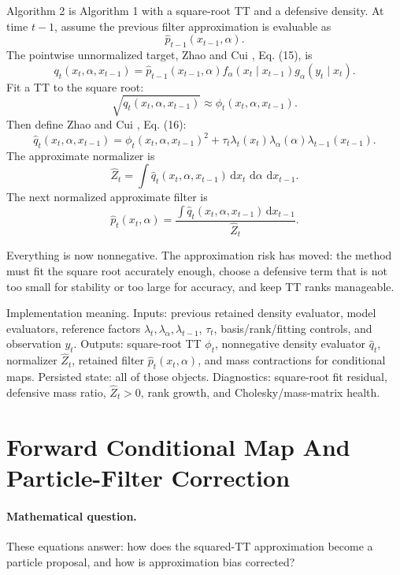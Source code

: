 \documentclass[11pt]{article}
\newcommand{\dd}{\,\mathrm d}
\begin{document}
Algorithm 2 is Algorithm 1 with a square-root TT and a defensive density.
At time \(t-1\), assume the previous filter approximation is evaluable as
\[
    \widehat p_{t-1}(x_{t-1},\alpha).
\]
The pointwise unnormalized target, Zhao and Cui \cite{zhao2024ttsequential}, Eq. (15), is
\[
    q_t(x_t,\alpha,x_{t-1})
    =
    \widehat p_{t-1}(x_{t-1},\alpha)
    f_\alpha(x_t\mid x_{t-1})
    g_\alpha(y_t\mid x_t).
    \label{eq:p24-a2-1}
\]
Fit a TT to the square root:
\[
    \sqrt{q_t(x_t,\alpha,x_{t-1})}
    \approx
    \phi_t(x_t,\alpha,x_{t-1}).
    \label{eq:p24-a2-2}
\]
Then define Zhao and Cui \cite{zhao2024ttsequential}, Eq. (16):
\[
    \widehat q_t(x_t,\alpha,x_{t-1})
    =
    \phi_t(x_t,\alpha,x_{t-1})^2
    +
    \tau_t\lambda_t(x_t)\lambda_\alpha(\alpha)\lambda_{t-1}(x_{t-1}).
    \label{eq:p24-a2-3}
\]
The approximate normalizer is
\[
    \widehat Z_t
    =
    \int \widehat q_t(x_t,\alpha,x_{t-1})
    \dd x_t\,\dd\alpha\,\dd x_{t-1}.
    \label{eq:p24-a2-4}
\]
The next normalized approximate filter is
\[
    \widehat p_t(x_t,\alpha)
    =
    \frac{\int \widehat q_t(x_t,\alpha,x_{t-1})\dd x_{t-1}}
    {\widehat Z_t}.
    \label{eq:p24-a2-5}
\]

Everything is now nonnegative.  The approximation risk has moved: the method
must fit the square root accurately enough, choose a defensive term that is not
too small for stability or too large for accuracy, and keep TT ranks manageable.

Implementation meaning. Inputs: previous retained density evaluator,
model evaluators, reference factors \(\lambda_t,\lambda_\alpha,\lambda_{t-1}\),
\(\tau_t\), basis/rank/fitting controls, and observation \(y_t\).  Outputs:
square-root TT \(\phi_t\), nonnegative density evaluator \(\widehat q_t\),
normalizer \(\widehat Z_t\), retained filter \(\widehat p_t(x_t,\alpha)\), and
mass contractions for conditional maps.  Persisted state: all of those objects.
Diagnostics: square-root fit residual, defensive mass ratio, \(\widehat Z_t>0\),
rank growth, and Cholesky/mass-matrix health.

\section{Forward Conditional Map And Particle-Filter Correction}

\paragraph{Mathematical question.}
These equations answer: how does the squared-TT approximation become a
particle proposal, and how is approximation bias corrected?
\end{document}
